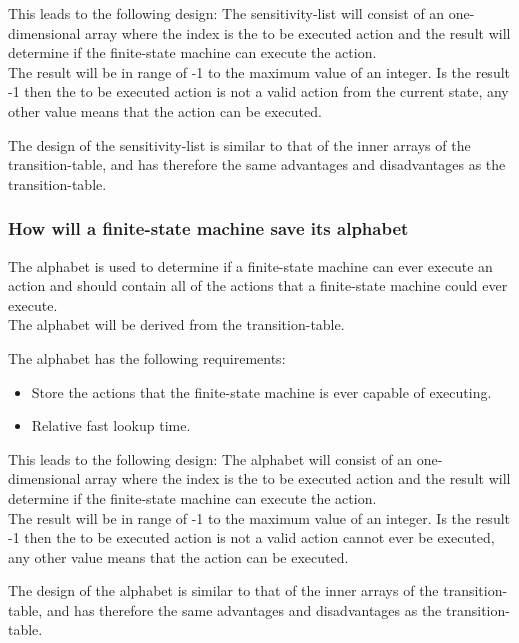 This leads to the following design: The sensitivity-list will consist of
an one-dimensional array where the index is the to be executed action
and the result will determine if the finite-state machine can execute
the action.\\
The result will be in range of -1 to the maximum value of an integer. Is
the result -1 then the to be executed action is not a valid action from
the current state, any other value means that the action can be
executed.

The design of the sensitivity-list is similar to that of the inner
arrays of the transition-table, and has therefore the same advantages
and disadvantages as the transition-table.

\hypertarget{how-will-a-finite-state-machine-save-its-alphabet}{%
\subsubsection{How will a finite-state machine save its
alphabet}\label{how-will-a-finite-state-machine-save-its-alphabet}}

The alphabet is used to determine if a finite-state machine can ever
execute an action and should contain all of the actions that a
finite-state machine could ever execute.\\
The alphabet will be derived from the transition-table.

The alphabet has the following requirements:

\begin{itemize}
\tightlist
\item
  Store the actions that the finite-state machine is ever capable of
  executing.
\item
  Relative fast lookup time.
\end{itemize}

This leads to the following design: The alphabet will consist of an
one-dimensional array where the index is the to be executed action and
the result will determine if the finite-state machine can execute the
action.\\
The result will be in range of -1 to the maximum value of an integer. Is
the result -1 then the to be executed action is not a valid action
cannot ever be executed, any other value means that the action can be
executed.

The design of the alphabet is similar to that of the inner arrays of the
transition-table, and has therefore the same advantages and
disadvantages as the transition-table.

